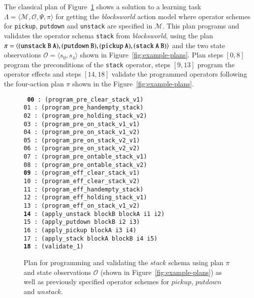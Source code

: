 \documentclass[3p,times]{elsarticle}
\newcommand{\tup}[1]{{\langle #1 \rangle}}
\begin{document}
The classical plan of Figure~\ref{fig:plan-lplan} shows a solution to a learning task $\Lambda=\tup{\mathcal{M},\mathcal{O},\Psi,\pi}$ for getting the {\em blocksworld} action model where operator schemes for {\tt\small pickup}, {\tt\small putdown} and {\tt\small unstack} are specified in $\mathcal{M}$. This plan programs and validates the operator schema {\tt\small stack} from {\em blocksworld}, using the plan $\pi=\tup{\small\tt (unstack\ B\ A), (putdown\ B), (pickup\ A), (stack\ A\ B)}$ and the two state observations $\mathcal{O}=\tup{s_0,s_4}$ shown in Figure~\ref{fig:example-plans}. Plan steps $[0,8]$ program the preconditions of the {\tt\small stack} operator, steps $[9,13]$ program the operator effects and steps $[14,18]$ validate the programmed operators following the four-action plan $\pi$ shown in the Figure~\ref{fig:example-plans}.

\begin{figure}[hbt!]
{\footnotesize\tt
     {\bf 00} : (program\_pre\_clear\_stack\_v1)\\
     01 : (program\_pre\_handempty\_stack)\\
     02 : (program\_pre\_holding\_stack\_v2)\\
     03 : (program\_pre\_on\_stack\_v1\_v1)\\
     04 : (program\_pre\_on\_stack\_v1\_v2)\\
     05 : (program\_pre\_on\_stack\_v2\_v1)\\
     06 : (program\_pre\_on\_stack\_v2\_v2)\\
     07 : (program\_pre\_ontable\_stack\_v1)\\
     08 : (program\_pre\_ontable\_stack\_v2)\\
     {\bf 09} : (program\_eff\_clear\_stack\_v1)\\
    10 : (program\_eff\_clear\_stack\_v2)\\
    11 : (program\_eff\_handempty\_stack)\\
    12 : (program\_eff\_holding\_stack\_v1)\\
    13 : (program\_eff\_on\_stack\_v1\_v2)\\
    {\bf 14} : (apply\_unstack blockB blockA i1 i2)\\
    15 : (apply\_putdown blockB i2 i3)\\
    16 : (apply\_pickup blockA i3 i4)\\
    17 : (apply\_stack blockA blockB i4 i5)\\
    {\bf 18} : (validate\_1)
}
 \caption{\small Plan for programming and validating the $stack$ schema using plan $\pi$ and state observations $\mathcal{O}$ (shown in Figure~\ref{fig:example-plans}) as well as previously specified operator schemes for $pickup$, $putdown$ and $unstack$.}
\label{fig:plan-lplan}
\end{figure}
\end{document}
